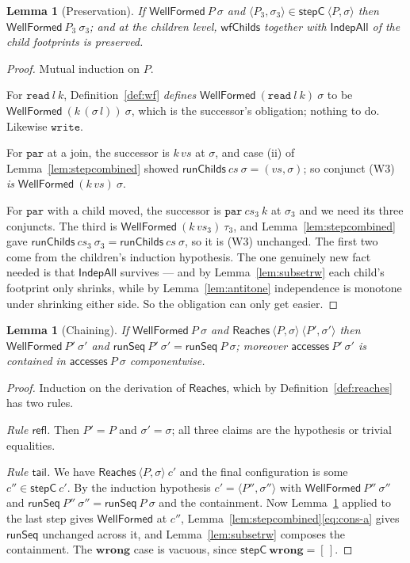 \documentclass[11pt,a4paper]{article}
\theoremstyle{definition}
\theoremstyle{plain}
\newtheorem{lemma}[definition]{Lemma}
\theoremstyle{remark}
\newcommand{\st}{\sigma}
\newcommand{\acc}{\mathsf{accesses}}
\newcommand{\runSeq}{\mathsf{runSeq}}
\newcommand{\wf}{\mathsf{WellFormed}}
\newcommand{\Reaches}{\mathsf{Reaches}}
\newcommand{\wrong}{\mathbf{wrong}}
\begin{document}
\begin{lemma}[Preservation]\label{lem:preserved}
If $\wf\ P\ \st$ and $\langle P_3, \st_3\rangle \in \mathsf{stepC}\ \langle P, \st\rangle$
then $\wf\ P_3\ \st_3$; and at the children level, $\mathsf{wfChilds}$ together with
$\mathsf{IndepAll}$ of the child footprints is preserved.
\end{lemma}

\begin{proof}
Mutual induction on $P$.

For $\texttt{read}\ l\ k$, Definition~\ref{def:wf} \emph{defines}
$\wf\ (\texttt{read}\ l\ k)\ \st$ to be $\wf\ (k\,(\st\,l))\ \st$, which is the successor's
obligation; nothing to do. Likewise $\texttt{write}$.

For $\texttt{par}$ at a join, the successor is $k\,vs$ at $\st$, and case (ii) of
Lemma~\ref{lem:stepcombined} showed $\mathsf{runChilds}\ cs\ \st = (vs,\st)$; so conjunct
(W3) \emph{is} $\wf\ (k\,vs)\ \st$.

For $\texttt{par}$ with a child moved, the successor is $\texttt{par}\ cs_3\ k$ at $\st_3$ and
we need its three conjuncts. The third is $\wf\ (k\,vs_3)\ \tau_3$, and
Lemma~\ref{lem:stepcombined} gave $\mathsf{runChilds}\ cs_3\ \st_3 = \mathsf{runChilds}\ cs\ \st$,
so it is (W3) unchanged. The first two come from the children's induction hypothesis. The one
genuinely new fact needed is that $\mathsf{IndepAll}$ survives --- and by
Lemma~\ref{lem:subsetrw} each child's footprint only shrinks, while by
Lemma~\ref{lem:antitone} independence is monotone under shrinking either side. So the
obligation can only get easier.
\end{proof}

\begin{lemma}[Chaining]\label{lem:chain}
If $\wf\ P\ \st$ and $\Reaches\ \langle P,\st\rangle\ \langle P', \st'\rangle$ then
$\wf\ P'\ \st'$ and $\runSeq\ P'\ \st' = \runSeq\ P\ \st$; moreover $\acc\ P'\ \st'$ is
contained in $\acc\ P\ \st$ componentwise.
\end{lemma}

\begin{proof}
Induction on the derivation of $\Reaches$, which by Definition~\ref{def:reaches} has two
rules.

\emph{Rule $\mathsf{refl}$.} Then $P' = P$ and $\st' = \st$; all three claims are the
hypothesis or trivial equalities.

\emph{Rule $\mathsf{tail}$.} We have $\Reaches\ \langle P,\st\rangle\ c'$ and the final
configuration is some $c'' \in \mathsf{stepC}\ c'$. By the induction hypothesis
$c' = \langle P'', \st''\rangle$ with $\wf\ P''\ \st''$ and
$\runSeq\ P''\ \st'' = \runSeq\ P\ \st$ and the containment. Now Lemma~\ref{lem:preserved}
applied to the last step gives $\wf$ at $c''$, Lemma~\ref{lem:stepcombined}\eqref{eq:cons-a}
gives $\runSeq$ unchanged across it, and Lemma~\ref{lem:subsetrw} composes the containment.
The $\wrong$ case is vacuous, since $\mathsf{stepC}\ \wrong = [\,]$.
\end{proof}
\end{document}
